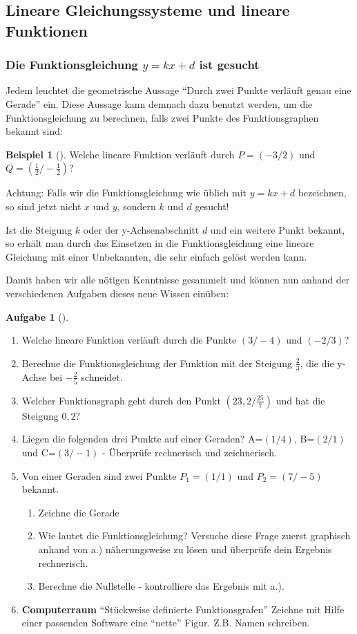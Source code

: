 \documentclass[a4paper, twoside, parskip, 10pt, smallheadings]{scrbook}
\theoremstyle{plain}
\theoremstyle{definition}
\newtheorem{Bsp}{Beispiel}%
\newtheorem{Auf}{Aufgabe}%
\newenvironment{fshaded}{%
\def\FrameCommand{\fcolorbox{framecolor}{shadecolor}}%
\MakeFramed {\FrameRestore}}%
{\endMakeFramed}
\newenvironment{fbsp}[1][]{\definecolor{shadecolor}{rgb}{.57,1,.28}%
\definecolor{framecolor}{rgb}{.25, .63, 0}%
\begin{fshaded}\begin{Bsp}[#1]}{\end{Bsp}\end{fshaded}}
\newenvironment{fauf}[1][]{\definecolor{shadecolor}{rgb}{.58,.788,1}%
\definecolor{framecolor}{rgb}{.13,.25,.9}%
\begin{fshaded}\begin{Auf}[#1]}{\end{Auf}\end{fshaded}}
\newcommand{\bb}{\begin{fbsp}}
\newcommand{\eb}{\end{fbsp}}
\newcommand{\ba}{\begin{fauf}}
\newcommand{\ea}{\end{fauf}}
\begin{document}
\subsection{Lineare Gleichungssysteme und lineare Funktionen}\label{linfkl_lings}


\subsubsection{Die Funktionsgleichung $y=kx+d$ ist gesucht}
Jedem leuchtet die geometrische Aussage "`Durch zwei Punkte verl\"{a}uft genau eine Gerade"' ein. Diese Aussage
kann demnach dazu benutzt werden, um die Funktionsgleichung zu berechnen, falls zwei Punkte des
Funktionsgraphen bekannt sind:

\bb Welche lineare Funktion verl\"{a}uft durch $P=(-3/2)$ und $Q=(\frac{1}{2}/-\frac{1}{2})$? \eb

Achtung: Falls wir die Funktionsgleichung wie \"{u}blich mit $y=kx+d$ bezeichnen, so sind jetzt nicht $x$ und
$y$, sondern $k$ und $d$ gesucht!

Ist die Steigung $k$ oder der y-Achsenabschnitt $d$ und ein weitere Punkt bekannt, so erh\"{a}lt man durch das
Einsetzen in die Funktionsgleichung eine lineare Gleichung mit einer Unbekannten, die sehr einfach gel\"{o}st
werden kann.

Damit haben wir alle n\"{o}tigen Kenntnisse gesammelt und k\"{o}nnen nun anhand der verschiedenen Aufgaben dieses
neue Wissen ein\"{u}ben:
\ba 
\begin{enumerate}
\item Welche lineare Funktion verl\"{a}uft durch die Punkte $(3/-4)$ und
$(-2/3)$?
\item Berechne die Funktionsgleichung der Funktion mit der
Steigung $\frac{2}{3}$, die die y-Achse bei $-\frac{2}{5}$ schneidet.
\item Welcher Funktionsgraph geht durch den Punkt
$(23,2/\frac{25}{7})$ und hat die Steigung $0,2$?
\item Liegen die folgenden drei Punkte auf einer Geraden?
A=$(1/4)$, B=$(2/1)$ und C=$(3/-1)$ - \"{U}berpr\"{u}fe rechnerisch und zeichnerisch. 

\item Von einer Geraden sind zwei Punkte $P_1=(1/1)$ und
$P_2=(7/-5)$ bekannt.
\begin{enumerate}
\item Zeichne die Gerade
\item Wie lautet die Funktionsgleichung? Versuche diese Frage zuerst
graphisch anhand von a.) n\"{a}herungsweise zu l\"{o}sen und \"{u}berpr\"{u}fe dein Ergebnis rechnerisch.
\item Berechne die Nullstelle - kontrolliere das Ergebnis mit a.).
\end{enumerate}

\item 
{\bf Computerraum} "`Stückweise definierte Funktionsgrafen"'
Zeichne mit Hilfe einer passenden Software eine "`nette"' Figur. Z.B. Namen schreiben.
\end{enumerate}
\ea 
\end{document}
